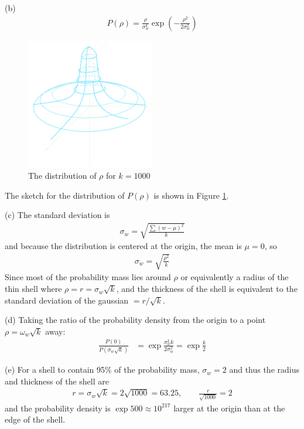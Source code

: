 \documentclass[../main.tex]{subfiles}
\begin{document}
(b)
\begin{align*}
    P(\rho) = \frac{\rho}{\sigma_w^k} \exp(-\frac{\rho^2}{2\sigma_w^2})
\end{align*}
\begin{figure}[h]
    \centering
    \includegraphics[width=0.5\textwidth]{hw2_2b.png}
    \caption{The distribution of $\rho$ for $k = 1000$}
    \label{fig:hw2_2b}
\end{figure}
The sketch for the distribution of $P(\rho)$ is shown in Figure \ref{fig:hw2_2b}.

(c) The standard deviation is
\begin{align*}
    \sigma_w = \sqrt{\frac{\sum (w - \mu)^2}{k}} 
\end{align*}
and because the distribution is centered at the origin, the mean is $\mu = 0$, so
\begin{align*}
    \sigma_w = \sqrt{\frac{\rho^2}{k}}
\end{align*}
Since most of the probability mass lies around $\rho$ or equivalently a radius of the thin shell
where $\rho = r = \sigma_w \sqrt{k}$, and the thickness of the shell is equivalent to the standard
deviation of the gaussian $ = r / \sqrt{k}$.

(d) Taking the ratio of the probability density from the origin to a point $\rho = \omega_w \sqrt k$
away:
\begin{align*}
    \frac{P(0)}{P(\sigma_w \sqrt k)} &= \exp{\frac{\sigma_w ^2 k}{2 \sigma_w^2 }} =\exp{\frac{k}{2}}
\end{align*}

(e) For a shell to contain 95\% of the probability mass, $\sigma_w = 2$ and thus the radius and 
thickness of the shell are
\begin{align*}
    r = \sigma_w \sqrt k = 2\sqrt{1000} = 63.25, \qquad \frac{r}{\sqrt{1000}} = 2
\end{align*}
and the probability density is $\exp{500} \approx 10^{217}$ larger at the origin than at the edge
of the shell.
\end{document}

